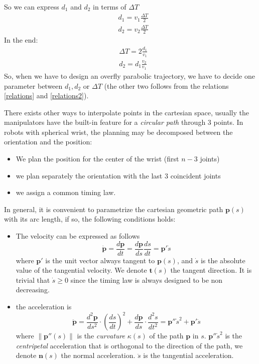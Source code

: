 \documentclass[10pt, letterpaper]{report}
\begin{document}
So we can express $d_1$ and $d_2$ in terms of $\Delta T$\begin{align}
    &d_1=v_1\frac{\Delta T}{2}\\ 
    &d_2=v_2\frac{\Delta T}{2}
\end{align}
In the end:\begin{align}\label{relations}
    &\Delta T=2\frac{d_1}{v_1}\\  \label{relations2}
    &d_2=d_1\frac{v_2}{v_1}
\end{align}
So, when we have to design an overfly parabolic trajectory, we have to decide one parameter between $d_1,d_2$ or $\Delta T$ (the other two follows from the relations \eqref{relations} and \eqref{relations2}).
\bigskip

There exists other ways to interpolate points in the cartesian space, usually the manipulators have the built-in feature for a \textit{circular path} through 3 points. In robots with spherical wrist, the planning may be decomposed between the orientation and the position:\begin{itemize}
    \item We plan the position for the center of the wrist (first $n-3$ joints)
    \item we plan separately the orientation with the last 3 coincident joints
    \item we assign a common timing law.
\end{itemize}
In general, it is convenient to parametrize the cartesian geometric path $\mathbf p(s)$ with its arc length, if so, the following conditions holds:\begin{itemize}
    \item The velocity can be expressed as follows\begin{equation}
        \dot{\mathbf p}=\frac{d\mathbf p}{dt}=\frac{d\mathbf p}{ds}\frac{ds}{dt}=\mathbf p'\dot s
    \end{equation}
    where $\mathbf p'$ is the unit vector always tangent to $\mathbf p(s)$, and $\dot s$ is the absolute value of the tangential velocity. We denote $\mathbf t(s)$ the tangent direction. It is trivial that  $\dot s\ge 0$ since the timing law is always designed to be non decreasing.
    \item the acceleration is\begin{equation}
        \ddot{\mathbf p}=
        \frac{d^2\mathbf p}{ds^2}\cdot\left(\frac{ds}{dt}\right)^2+
         \frac{d\mathbf p}{ds}\cdot\frac{d^2s}{dt^2}=\mathbf p''\dot s^2+\mathbf p'\ddot s
    \end{equation}
    where $\|\mathbf p''(s)\|$ is the \textit{curvature} $\kappa(s)$ of the path $\mathbf p$ in $s$. 
    $\mathbf p''\dot s^2$ is the \textit{centripetal} acceleration that is orthogonal to the direction of the path, we denote $\mathbf n(s)$ the normal acceleration. $\ddot s$ is the tangential acceleration.
\end{itemize}
\end{document}
